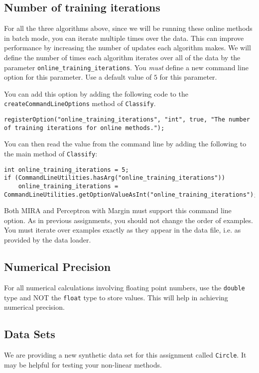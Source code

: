 \documentclass[11pt]{article}
\newcommand{\code}[1]{{\footnotesize \tt #1}}
\begin{document}
\subsection{Number of training iterations}
For all the three algorithms above, since we will be running these online methods in batch mode, you can iterate multiple times over the data. This can improve performance by increasing the number of updates each algorithm makes. We will define the number of times each algorithm iterates over all of the data by the parameter \code{online\_training\_iterations}. You \emph{must} define a new command line option for this parameter. Use a default value of $5$ for this parameter.

You can add this option by adding the following code to the \code{createCommandLineOptions} method of \code{Classify}.
\begin{footnotesize}
\begin{verbatim}
registerOption("online_training_iterations", "int", true, "The number of training iterations for online methods.");
\end{verbatim}
\end{footnotesize}


You can then read the value from the command line by adding the following to the main method of \code{Classify}:
\begin{footnotesize}
\begin{verbatim}
int online_training_iterations = 5;
if (CommandLineUtilities.hasArg("online_training_iterations"))
    online_training_iterations = CommandLineUtilities.getOptionValueAsInt("online_training_iterations");
\end{verbatim}
\end{footnotesize}

Both MIRA and Perceptron with Margin must support this command line option. As in previous assignments, you should not change the order of examples. You must iterate over examples exactly as they appear in the data file, i.e. as provided by the data loader.


\subsection{Numerical Precision}
For all numerical calculations involving floating point numbers, use the {\tt double} type and NOT the {\tt float} type to store values.
This will help in achieving numerical precision.

\subsection{Data Sets}
We are providing a new synthetic data set for this assignment called \code{Circle}. It may be helpful for testing your non-linear methods.
\end{document}
